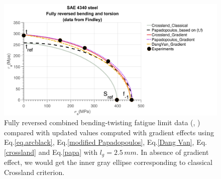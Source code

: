 \begin{figure}[!h]
	\includegraphics[width=\textwidth]{figures//4340.png}
	\caption{Fully reversed combined bending-twisting fatigue limit data (\cite{findley1956theory}, \cite{Papadopoulos1996513}) compared with updated values computed with gradient effects using 	Eq.\eqref{eq.arcblack}, Eq.\eqref{modified Papadopoulos}, Eq.\eqref{Dang Van}, Eq.\eqref{crossland} and Eq.\eqref{papa} with $l_g = 2.5 \, mm$. In absence of gradient effect, we would get the inner gray ellipse corresponding to classical Crossland criterion.}
	\label{4340}
\end{figure}



\newpage
